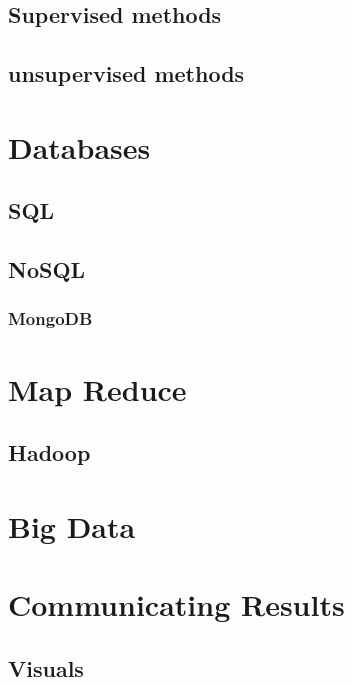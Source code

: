 \documentclass[10pt]{PhDthesisPSnPDF}%
\begin{document}
\section{Supervised methods}
\section{unsupervised methods}
\chapter{Databases}\label{databases}
\section{SQL}
\section{NoSQL}
\subsection{MongoDB}
\chapter{Map Reduce}\label{mapR}
\section{Hadoop}
\chapter{Big Data}\label{bigData}
\chapter{Communicating Results}\label{Commun}
\section{Visuals}\label{Visuals}






\end{document}
